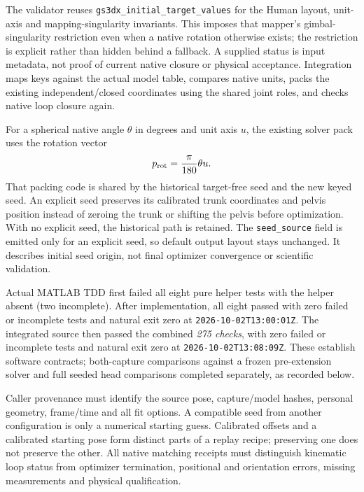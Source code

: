 \documentclass[11pt,a4paper]{article}
\begin{document}
The validator reuses \texttt{gs3dx\_initial\_target\_values} for the Human
layout, unit-axis and mapping-singularity invariants. This imposes that mapper's
gimbal-singularity restriction even when a native rotation otherwise exists;
the restriction is explicit rather than hidden behind a fallback. A supplied
status is input metadata, not proof of current native closure or physical
acceptance. Integration maps keys against the actual model table, compares
native units, packs the existing independent/closed coordinates using the
shared joint roles, and checks native loop closure again.

For a spherical native angle $\theta$ in degrees and unit axis $u$, the
existing solver pack uses the rotation vector
\[
 p_{\rm rot}=\frac{\pi}{180}\theta u.
\]
That packing code is shared by the historical target-free seed and the new
keyed seed. An explicit seed preserves its calibrated trunk coordinates and
pelvis position instead of zeroing the trunk or shifting the pelvis before
optimization. With no explicit seed, the historical path is retained.
The \texttt{seed\_source} field is emitted only for an explicit seed, so
default output layout stays unchanged. It describes initial seed origin,
not final optimizer convergence or scientific validation.

Actual MATLAB TDD first failed all eight pure helper tests with the helper
absent (two incomplete). After implementation, all eight passed with zero
failed or incomplete tests and natural exit zero at
\texttt{2026-10-02T13:00:01Z}. The integrated source then passed the combined
\emph{275 checks}, with zero failed or incomplete tests and natural exit
zero at \texttt{2026-10-02T13:08:09Z}. These establish software contracts;
both-capture comparisons against a frozen pre-extension solver and full
seeded head comparisons completed separately, as recorded below.

Caller provenance must identify the source pose, capture/model hashes,
personal geometry, frame/time and all fit options. A compatible seed from
another configuration is only a numerical starting guess. Calibrated offsets
and a calibrated starting pose form distinct parts of a replay recipe;
preserving one does not preserve the other. All native matching receipts must
distinguish kinematic loop status from optimizer termination, positional and
orientation errors, missing measurements and physical qualification.
\end{document}
